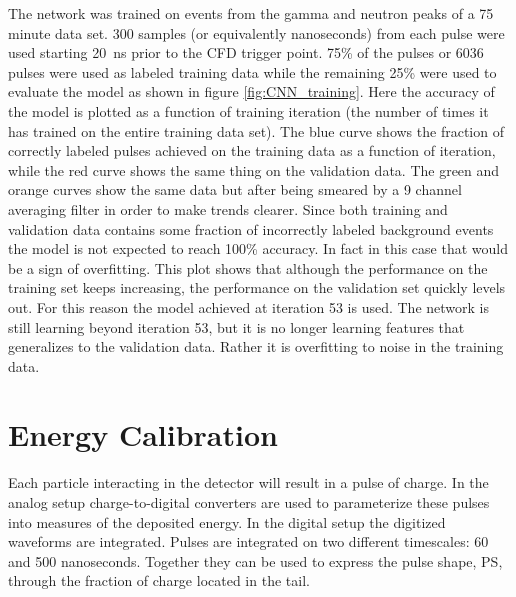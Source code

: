 \documentclass[main.tex]{subfiles}
\begin{document}
The network was trained on events from the gamma and neutron peaks of a 75 minute data set. 300 samples (or equivalently nanoseconds) from each pulse were used starting \SI{20}{ns} prior to the CFD trigger point. 75\% of the pulses or 6036 pulses were used as labeled training data while the remaining 25\% were used to evaluate the model as shown in figure \ref{fig:CNN_training}. Here the accuracy of the model is plotted as a function of training iteration (the number of times it has trained on the entire training data set). The blue curve shows the fraction of correctly labeled pulses achieved on the training data as a function of iteration, while the red curve shows the same thing on the validation data. The green and orange curves show the same data but after being smeared by a 9 channel averaging filter in order to make trends clearer. Since both training and validation data contains some fraction of incorrectly labeled background events the model is not expected to reach 100\% accuracy. In fact in this case that would be a sign of overfitting. This plot shows that although the performance on the training set keeps increasing, the performance on the validation set quickly levels out. For this reason the model achieved at iteration 53 is used. The network is still learning beyond iteration 53, but it is no longer learning features that generalizes to the validation data. Rather it is overfitting to noise in the training data.


\section{Energy Calibration}
Each particle interacting in the detector will result in a pulse of charge. In the analog setup charge-to-digital converters are used to parameterize these pulses into measures of the deposited energy. In the digital setup the digitized waveforms are integrated. Pulses are integrated on two different timescales: 60 and 500 nanoseconds. Together they can be used to express the pulse shape, PS, through the fraction of charge located in the tail.
\end{document}
